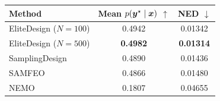 \begin{minipage}[t]{0.48\textwidth}
\centering\small
\renewcommand{\arraystretch}{1.05}
\begin{tabular}{lcc}
\toprule
\textbf{Method} & \shortstack{\textbf{Mean}\\\boldmath$p(\boldsymbol{{y}}^\star\mid\boldsymbol{{x}})$ $\uparrow$} & \shortstack{\textbf{NED}\\$\downarrow$} \\
\midrule
EliteDesign ($N=100$) & 0.4942 & 0.01342 \\
EliteDesign ($N=500$) & \textbf{0.4982} & \textbf{0.01314} \\
\midrule
SamplingDesign & 0.4890 & 0.01436 \\
SAMFEO & 0.4866 & 0.01480 \\
NEMO & 0.1807 & 0.04655 \\
\bottomrule
\end{tabular}
\label{tab:supp-rnasolo}
\end{minipage}
